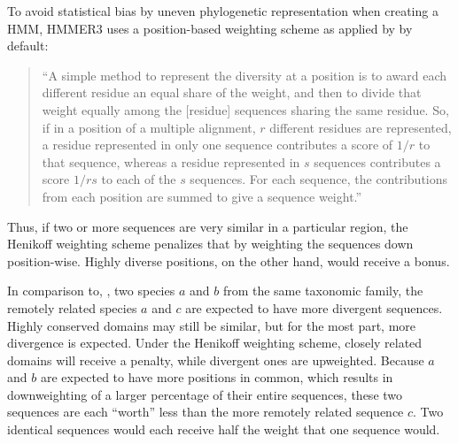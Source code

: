\label{sec:hmmtest}
To avoid statistical bias by uneven phylogenetic representation when creating a
HMM, HMMER3 \citep{eddy2009} uses a position-based weighting scheme as applied
by \citet{henikoff1994} by default: 

\begin{quote}
	``A simple method to represent the diversity at a position is to award each
	different residue an equal share of the weight, and then to divide that
	weight equally among the [residue] sequences sharing the same residue. So, if
	in a position of a multiple alignment, $r$ different residues are represented,
	a residue represented in only one sequence contributes a score of $1/r$ to
	that sequence, whereas a residue represented in $s$ sequences contributes a
	score $1/rs$ to each of the $s$ sequences. For each sequence, the
	contributions from each position are summed to give a sequence weight.''
	\hfill\citep{henikoff1994}
\end{quote} 

Thus, if two or more sequences are very similar in a particular region, the
Henikoff weighting scheme penalizes that by weighting the sequences down
position-wise. Highly diverse positions, on the other hand, would receive a
bonus. 

In comparison to, \eg, two species $a$ and $b$ from the same taxonomic family, the
remotely related species $a$ and $c$ are expected to have more divergent
sequences. Highly conserved domains may still be similar, but for the most part,
more divergence is expected. Under the Henikoff weighting scheme, closely
related domains will receive a penalty, while divergent ones are upweighted.
Because $a$ and $b$ are expected to have more positions in common, which results
in downweighting of a larger percentage of their entire sequences, these two
sequences are each ``worth'' less than the more remotely related sequence $c$.
Two identical sequences would each receive half the weight that one sequence
would.
